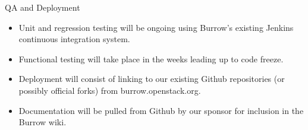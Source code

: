 \documentclass{beamer}
\begin{document}
\begin{frame}{QA and Deployment}
  \begin{itemize}
  \item Unit and regression testing will be ongoing using Burrow's existing Jenkins continuous integration system.
  \item Functional testing will take place in the weeks leading up to code freeze.
  \item Deployment will consist of linking to our existing Github repositories (or possibly official forks)
    from burrow.openstack.org.
  \item Documentation will be pulled from Github by our sponsor for inclusion in the Burrow wiki.
  \end{itemize}
\end{frame}
\end{document}
